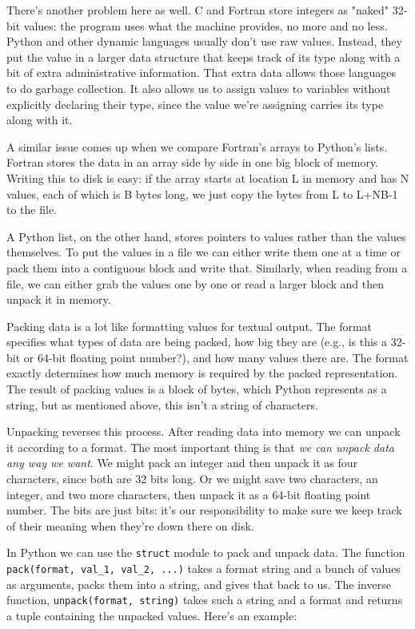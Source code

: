 \documentclass{scrbook}
\begin{document}
There's another problem here as well.
C and Fortran store integers as "naked" 32-bit values:
the program uses what the machine provides,
no more and no less.
Python and other dynamic languages usually don't use raw values.
Instead,
they put the value in a larger data structure
that keeps track of its type along with a bit of extra administrative information.
That extra data allows those languages to do garbage collection.
It also allows us to assign values to variables without explicitly declaring their type,
since the value we're assigning carries its type along with it.


A similar issue comes up when we compare Fortran's arrays to Python's lists.
Fortran stores the data in an array side by side in one big block of memory.
Writing this to disk is easy:
if the array starts at location L in memory and has N values,
each of which is B bytes long,
we just copy the bytes from L to L+NB-1 to the file.


A Python list,
on the other hand,
stores pointers to values rather than the values themselves.
To put the values in a file
we can either write them one at a time
or pack them into a contiguous block and write that.
Similarly,
when reading from a file,
we can either grab the values one by one
or read a larger block and then unpack it in memory.


Packing data is a lot like formatting values for textual output.
The format specifies what types of data are being packed,
how big they are (e.g., is this a 32-bit or 64-bit floating point number?),
and how many values there are.
The format exactly determines how much memory is required by the packed representation.
The result of packing values is a block of bytes,
which Python represents as a string,
but as mentioned above,
this isn't a string of characters.


Unpacking reverses this process.
After reading data into memory
we can unpack it according to a format.
The most important thing is that
\emph{we can unpack data any way we want}.
We might pack an integer and then unpack it as four characters,
since both are 32 bits long.
Or we might save two characters,
an integer,
and two more characters,
then unpack it as a 64-bit floating point number.
The bits are just bits:
it's our responsibility to make sure we keep track of their meaning
when they're down there on disk.


In Python we can use the \texttt{struct} module to pack and unpack data.
The function \texttt{pack(format, val\_1, val\_2, ...)}
takes a format string and a bunch of values as arguments,
packs them into a string,
and gives that back to us.
The inverse function, \texttt{unpack(format, string)} takes such a string and a format
and returns a tuple containing the unpacked values.
Here's an example:
\end{document}
